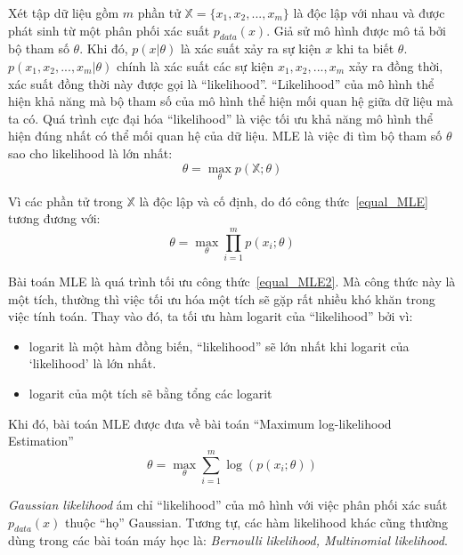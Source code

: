         Xét tập dữ liệu gồm $m$ phần tử $\mathbb{X} = \{x_1,x_2,...,x_m\}$ là độc lập với nhau và được phát sinh từ một phân phối xác suất $p_{data}(x)$.
        Giả sử mô hình được mô tả bởi bộ tham số $\theta$. Khi đó, $p(x|\theta)$ là xác suất xảy ra sự kiện $x$ khi ta biết $\theta$.
        $p(x_1,x_2,...,x_m|\theta)$ chính là xác suất các sự kiện $x_1,x_2,...,x_m$ xảy ra đồng thời, xác suất đồng thời này được gọi là ``likelihood''.
        ``Likelihood'' của mô hình thể hiện khả năng mà bộ tham số của mô hình thể hiện mối quan hệ giữa dữ liệu mà ta có.
        Quá trình cực đại hóa ``likelihood'' là việc tối ưu khả năng mô hình thể hiện đúng nhất có thể mối quan hệ của dữ liệu.
        MLE là việc đi tìm bộ tham số $\theta$ sao cho likelihood là lớn nhất:
        \begin{equation}
        \label{equal_MLE}
                \theta = \max_{\theta} p(\mathbb{X};\theta)
        \end{equation} 
        
        Vì các phần tử trong $\mathbb{X}$ là độc lập và cố định, do đó công thức~\ref{equal_MLE} tương đương với:
        \begin{equation}
        \label{equal_MLE2}
            \theta = \max_{\theta} \prod_{i=1}^m p(x_i;\theta)
        \end{equation}        
        
        Bài toán MLE là quá trình tối ưu công thức~\ref{equal_MLE2}. Mà công thức này là một tích, thường thì việc tối ưu hóa một tích sẽ gặp rất nhiều khó khăn
        trong việc tính toán.
        Thay vào đó, ta tối ưu hàm logarit của ``likelihood'' bởi vì:
        \begin{itemize}
            \item logarit là một hàm đồng biến, ``likelihood'' sẽ lớn nhất khi logarit của `likelihood' là lớn nhất.
            \item logarit của một tích sẽ bằng tổng các logarit
        \end{itemize}
        Khi đó, bài toán MLE được đưa về bài toán ``Maximum log-likelihood Estimation''
        \begin{equation}
        \label{equal_loglikelihood}
            \theta = \max_{\theta} \sum_{i=1}^m \log(p(x_i;\theta))
        \end{equation}
        
        \textit{Gaussian likelihood} ám chỉ ``likelihood'' của mô hình với việc phân phối xác suất $p_{data}(x)$ thuộc ``họ'' Gaussian.
        Tương tự, các hàm likelihood khác cũng thường dùng trong các bài toán máy học là:
        \textit{Bernoulli likelihood, Multinomial likelihood}.
        
